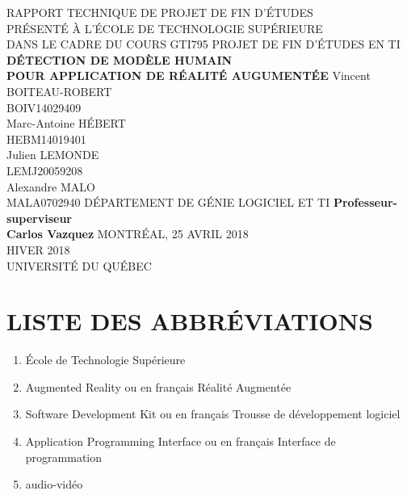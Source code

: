 \documentclass[letterpaper,twoside,12pt,french]{report}
\newcommand{\reportTitle}{\uppercase{Détection de modèle humain\\Pour application de réalité augumentée}}
\newcommand{\reportAuthors}{Vincent \uppercase{Boiteau-Robert\\BOIV14029409}\\Marc-Antoine \uppercase{Hébert\\HEBM14019401}\\Julien \uppercase{Lemonde\\LEMJ20059208}\\Alexandre \uppercase{Malo\\MALA0702940}}
\newcommand{\abbrItem}[2]{\item[\uppercase{\textbf{#1}} -] #2}
\begin{document}
\setlength{\parindent}{0cm}\setlength{\parskip}{2ex minus 0.2ex}
\begin{titlepage}
    \begin{center}
        \uppercase{Rapport technique de projet de fin d'études\\Présenté à l'école de technologie supérieure\\Dans le cadre du cours GTI795 Projet de fin d'études en TI}
        \vfill
        \textbf{\reportTitle}
        \vfill
        \reportAuthors
        \vfill
        \uppercase{Département de génie logiciel et TI}
        \vfill
        \textbf{Professeur-superviseur\\Carlos Vazquez}
        \vfill
        \uppercase{Montréal, 25 avril 2018\\Hiver 2018\\Université du Québec}
    \end{center}
\end{titlepage}
\cleardoublepage
\begin{abstract}
    \begin{center}
        \textbf{\uppercase{\Large{Résumé}}}
        \vspace{2ex}
        \\ \textbf{\reportTitle}
        \\ \vspace{1\baselineskip}
        \reportAuthors
        \\ \vspace{1\baselineskip}
        text résumé ici
    \end{center}
    \vspace{-\baselineskip}
\end{abstract}
\tableofcontents
\listoftables
\listoffigures
\chapter*{\uppercase{Liste des abbréviations}}
\begin{enumerate}
        \abbrItem{ÉTS}{École de Technologie Supérieure}
        \abbrItem{AR}{Augmented Reality ou en français Réalité Augmentée}
        \abbrItem{SDK}{Software Development Kit ou en français Trousse de développement logiciel}
        \abbrItem{API}{Application Programming Interface ou en français Interface de programmation}
        \abbrItem{AV}{audio-vidéo}
\end{enumerate}
\cleardoublepage
{}
\end{document}
